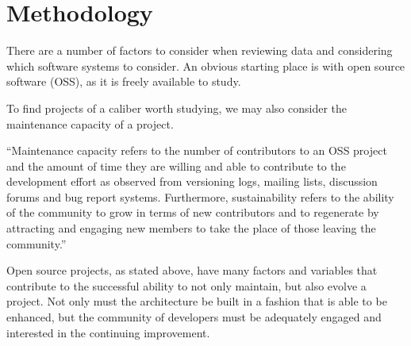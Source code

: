 \chapter{Methodology} \label{chapterMethodology}


There are a number of factors to consider when reviewing data and considering which software systems to consider. An obvious starting place is with open source software (OSS), as it is freely available to study.

To find projects of a caliber worth studying, we may also consider the maintenance capacity of a project.

\vspace{0.25cm}
\begin{displayquote}
  ``Maintenance capacity refers to the number of contributors to an OSS project and the amount of time they are willing and able to contribute to the development effort as observed from versioning logs, mailing lists, discussion forums and bug report systems. Furthermore, sustainability refers to the ability of the community to grow in terms of new contributors and to regenerate by attracting and engaging new members to take the place of those leaving the community.'' \cite{adewumi:2016}
\end{displayquote}
\vspace{0.25cm}

Open source projects, as stated above, have many factors and variables that contribute to the successful ability to not only maintain, but also evolve a project. Not only must the architecture be built in a fashion that is able to be enhanced, but the community of developers must be adequately engaged and interested in the continuing improvement.